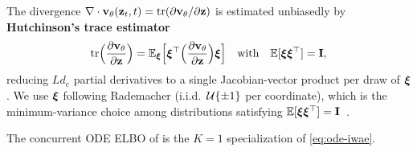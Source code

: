 \documentclass{article}
\begin{document}
\begin{remark}
The divergence $\nabla\cdot {\mathbf v}_\theta({\mathbf z}_t, t) = \operatorname{tr}(\partial {\mathbf v}_\theta/\partial {\mathbf z})$ is estimated unbiasedly by \textbf{Hutchinson's trace estimator}~\citep{hutchinson1989stochastic}
\begin{align*}
\operatorname{tr}\Bigl(\frac{\partial {\mathbf v}_\theta}{\partial {\mathbf z}}\Bigr) = \mathbb{E}_{\boldsymbol{\xi}}\Bigl[{\boldsymbol{\xi}}^\top \Bigl(\frac{\partial {\mathbf v}_\theta}{\partial {\mathbf z}}\Bigr) {\boldsymbol{\xi}}\Bigr]
\quad \text{with} \quad
\mathbb{E}[{\boldsymbol{\xi}}{\boldsymbol{\xi}}^\top] = {\mathbf I},
\end{align*}
reducing $L d_e$ partial derivatives to a single Jacobian-vector product per draw of ${\boldsymbol{\xi}}$. We use ${\boldsymbol{\xi}}$ following Rademacher (i.i.d.\ $\mathcal{U}\{\pm 1\}$ per coordinate), which is the minimum-variance choice among distributions satisfying $\mathbb{E}[{\boldsymbol{\xi}}{\boldsymbol{\xi}}^\top] = {\mathbf I}$~\citep{hutchinson1989stochastic}.
\end{remark}

\begin{remark}
    The concurrent ODE ELBO of \citet[Thm.~3.1]{chen2026langflow} is the $K = 1$ specialization of \cref{eq:ode-iwae}.
\end{remark}
\end{document}
